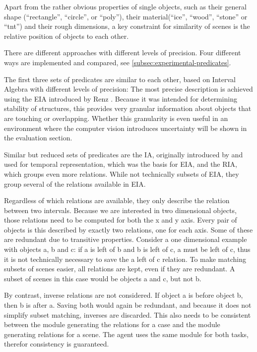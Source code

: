 Apart from the rather obvious properties of single objects, such as their general shape (``rectangle'', ``circle'', or ``poly''), their material(``ice'', ``wood'', ``stone'' or ``tnt'') and their rough dimensions, a key constraint for similarity of scenes is the relative position of objects to each other.

There are different approaches with different levels of precision. Four different ways are implemented and compared, see \ref{subsec:experimental-predicates}.

The first three sets of predicates are similar to each other, based on Interval Algebra with different levels of precision:
The most precise description is achieved using the \ac{EIA} introduced by Renz \cite{Renz-ERA}. Because it was intended for determining stability of structures, this provides very granular information about objects that are touching or overlapping.
Whether this granularity is even useful in an environment where the computer vision introduces uncertainty will be shown in the evaluation section.

Similar but reduced sets of predicates are the \ac{IA}, originally introduced by \cite{Allen-10.1145/182.358434} and used for temporal representation, which was the basis for \ac{EIA}, and the \ac{RIA}, which groups even more relations. While not technically subsets of EIA, they group several of the relations available in EIA.



Regardless of which relations are available, they only describe the relation between two intervals. Because we are interested in two dimensional objects, those relations need to be computed for both the x and y axis. Every pair of objects is this described by exactly two relations, one for each axis. Some of these are redundant due to transitive properties.
Consider a one dimensional example with objects a, b and c: if a is left of b and b is left of c, a must be left of c, thus it is not technically necessary to save the a left of c relation.
To make matching subsets of scenes easier, all relations are kept, even if they are redundant. A subset of scenes in this case would be objects a and c, but not b.

By contrast, inverse relations are not considered. If object a is before object b, then b is after a. Saving both would again be redundant, and because it does not simplify subset matching, inverses are discarded. This also needs to be consistent between the module generating the relations for a case and the module generating relations for a scene. The agent uses the same module for both tasks, therefor consistency is guaranteed.

